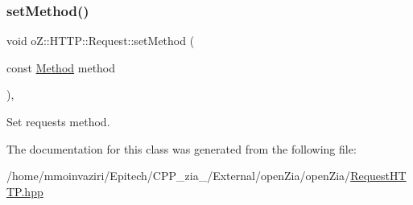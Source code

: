 \subsubsection{\texorpdfstring{setMethod()}{setMethod()}}
{\footnotesize\ttfamily void o\+Z\+::\+H\+T\+T\+P\+::\+Request\+::set\+Method (\begin{DoxyParamCaption}\item[{const \mbox{\hyperlink{namespaceo_z_1_1_h_t_t_p_a02d8497e4abbb0adf3af0fe9fad1b7a6}{Method}}}]{method }\end{DoxyParamCaption})\hspace{0.3cm}{\ttfamily [inline]}, {\ttfamily [noexcept]}}



Set request\textquotesingle{}s method. 



The documentation for this class was generated from the following file\+:\begin{DoxyCompactItemize}
\item 
/home/mmoinvaziri/\+Epitech/\+C\+P\+P\+\_\+zia\+\_/\+External/open\+Zia/open\+Zia/\mbox{\hyperlink{_request_h_t_t_p_8hpp}{Request\+H\+T\+T\+P.\+hpp}}\end{DoxyCompactItemize}
